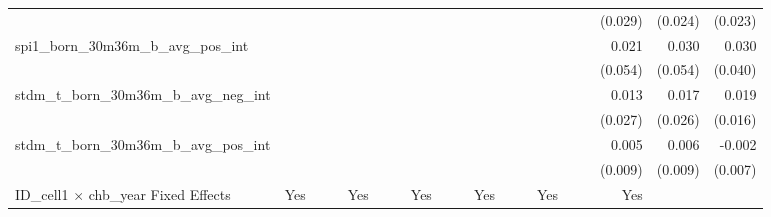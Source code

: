 \begin{tabular}{lrrrrrrrrrrrrrrrrrr}
                                            &              &              &              &              &              &              &              &              &               &              &              &               &              &              &               &      (0.029) &      (0.024) &       (0.023) \\ 
spi1\_born\_30m36m\_b\_avg\_pos\_int        &              &              &              &              &              &              &              &              &               &              &              &               &              &              &               &        0.021 &        0.030 &         0.030 \\ 
                                            &              &              &              &              &              &              &              &              &               &              &              &               &              &              &               &      (0.054) &      (0.054) &       (0.040) \\ 
stdm\_t\_born\_30m36m\_b\_avg\_neg\_int     &              &              &              &              &              &              &              &              &               &              &              &               &              &              &               &        0.013 &        0.017 &         0.019 \\ 
                                            &              &              &              &              &              &              &              &              &               &              &              &               &              &              &               &      (0.027) &      (0.026) &       (0.016) \\ 
stdm\_t\_born\_30m36m\_b\_avg\_pos\_int     &              &              &              &              &              &              &              &              &               &              &              &               &              &              &               &        0.005 &        0.006 &        -0.002 \\ 
                                            &              &              &              &              &              &              &              &              &               &              &              &               &              &              &               &      (0.009) &      (0.009) &       (0.007) \\ 
\midrule
ID\_cell1 $\times$ chb\_year Fixed Effects  &          Yes &              &              &          Yes &              &              &          Yes &              &               &          Yes &              &               &          Yes &              &               &          Yes &              &               \\ 

\end{tabular}
